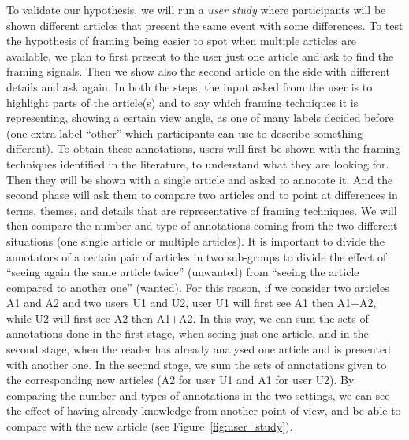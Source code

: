 

To validate our hypothesis, we will run a \emph{user study} where participants will be shown different articles that present the same event with some differences.
To test the hypothesis of framing being easier to spot when multiple articles are available, we plan to first present to the user just one article and ask to find the framing signals. Then we show also the second article on the side with different details and ask again.
In both the steps, the input asked from the user is to highlight parts of the article(s) and to say which framing techniques it is representing, showing a certain view angle, as one of many labels decided before (one extra label ``other'' which participants can use to describe something different). %
To obtain these annotations, users will first be shown with the framing techniques identified in the literature, to understand what they are looking for.
Then they will be shown with a single article and asked to annotate it. And the second phase will ask them to compare two articles and to point at differences in terms, themes, and details that are representative of framing techniques.
We will then compare the number and type of annotations coming from the two different situations (one single article or multiple articles).
It is important to divide the annotators of a certain pair of articles in two sub-groups to divide the effect of ``seeing again the same article twice'' (unwanted) from ``seeing the article compared to another one'' (wanted).
For this reason, if we consider two articles A1 and A2 and two users U1 and U2, user U1 will first see A1 then A1+A2, while U2 will first see A2 then A1+A2.
In this way, we can sum the sets of annotations done in the first stage, when seeing just one article, and in the second stage, when the reader has already analysed one article and is presented with another one. In the second stage, we sum the sets of annotations given to the corresponding new articles (A2 for user U1 and A1 for user U2).
By comparing the number and types of annotations in the two settings, we can see the effect of having already knowledge from another point of view, and be able to compare with the new article (see Figure~\ref{fig:user_study}).


